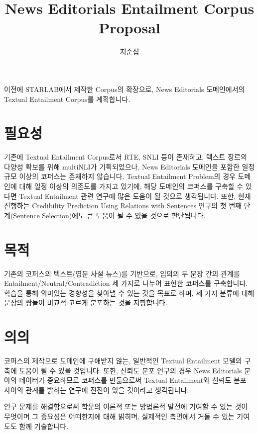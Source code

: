 \documentclass{article}
\author{지준섭}
\title{News Editorials Entailment Corpus Proposal}
\begin{document}
\maketitle
이전에 STARLAB에서 제작한 Corpus\cite{credcorpus}의 확장으로,
News Editorials 도메인에서의 Textual Entailment Corpus를 계획합니다.

\section{필요성}
기존에 Textual Entailment Corpus로서 RTE, SNLI\cite{snli:emnlp2015} 등이 존재하고,
텍스트 장르의 다양성 확보를 위해 multiNLI\cite{multinli}가 기획되었으나,
News Editorials 도메인을 포함한 일정 규모 이상의 코퍼스는 존재하지 않습니다.
Textual Entailment Problem의 경우 도메인에 대해 일정 이상의 의존도를 가지고 있기에,
해당 도메인의 코퍼스를 구축할 수 있다면 Textual Entailment 관련 연구에
많은 도움이 될 것으로 생각됩니다.
또한, 현재 진행하는 Credibility Prediction Using Relations with Sentences 연구의
첫 번째 단계(Sentence Selection)에도 큰 도움이 될 수 있을 것으로 판단됩니다.

\section{목적}
기존의 코퍼스의 텍스트(영문 사설 뉴스)를 기반으로, 임의의 두 문장 간의 관계를
Entailment/Neutral/Contradiction 세 가지로 나누어 표현한 코퍼스를 구축합니다.
학습을 통해 의미있는 경향성을 찾아낼 수 있는 것을 목표로 하며,
세 가지 분류에 대해 문장의 쌍들이 비교적 고르게 분포하는 것을 지향합니다.

\section{의의}
코퍼스의 제작으로 도메인에 구애받지 않는,
일반적인 Textual Entailment 모델의 구축에 도움이 될 수 있을 것입니다.
또한, 신뢰도 분포 연구의 경우 News Editorials 분야의 데이터가 중요하므로
코퍼스를 만듦으로써 Textual Entailment와 신뢰도 분포 사이의 관계를 밝히는 연구에
진전이 있을 것이라고 생각됩니다.

연구 문제를 해결함으로써
학문의 이론적 또는 방법론적 발전에 기여할 수 있는 것이
무엇이며 그 중요성은 어떠한지에 대해 밝히며,
실제적인 측면에서 거둘 수 있는 기여도도 함께 기술합니다.
\end{document}

